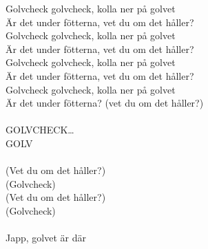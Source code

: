 \documentclass[a6paper, 10pt, twoside]{article}
\begin{document}
\begin{lyrics}
Golvcheck golvcheck, kolla ner på golvet\\
Är det under fötterna, vet du om det håller?\\
Golvcheck golvcheck, kolla ner på golvet\\
Är det under fötterna, vet du om det håller?\\
Golvcheck golvcheck, kolla ner på golvet\\
Är det under fötterna, vet du om det håller?\\
Golvcheck golvcheck, kolla ner på golvet\\
Är det under fötterna? (vet du om det håller?)\\
\vspace{5pt}\\
GOLVCHECK…\\
GOLV\\
\vspace{5pt}\\
(Vet du om det håller?)\\
(Golvcheck)\\
(Vet du om det håller?)\\
(Golvcheck)\\
\vspace{5pt}\\
Japp, golvet är där\\
\end{lyrics}

\end{document}
